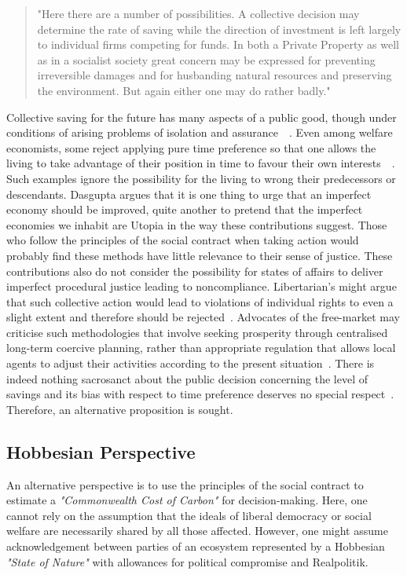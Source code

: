 \documentclass[12pt, oneside]{article}   	%
\begin{document}
\begin{quote}
"Here there are a number of possibilities. A collective decision may determine the rate of saving while the direction of investment is left largely to individual firms competing for funds. In both a Private Property as well as in a socialist society great concern may be expressed for preventing irreversible damages and for husbanding natural resources and preserving the environment. But again either one may do rather badly."~\cite{jr1}
\end{quote}

Collective saving for the future has many aspects of a public good, though under conditions of arising problems of isolation and assurance~\cite{as1}~\cite{ms1}.
Even among welfare economists, some reject applying pure time preference so that one allows the living to take advantage of their position in time to favour their own interests~\cite{hs1}~\cite{fr1}.
Such examples ignore the possibility for the living to wrong their predecessors or descendants.
Dasgupta argues that it is one thing to urge that an imperfect economy should be improved, quite another to pretend that the imperfect economies we inhabit are Utopia in the way these contributions suggest.
Those who follow the principles of the social contract when taking action would probably find these methods have little relevance to their sense of justice.
These contributions also do not consider the possibility for states of affairs to deliver imperfect procedural justice leading to noncompliance.
Libertarian's might argue that such collective action would lead to violations of individual rights to even a slight extent and therefore should be rejected~\cite{rn1}.
Advocates of the free-market may criticise such methodologies that involve seeking prosperity through centralised long-term coercive planning, rather than appropriate regulation that allows local agents to adjust their activities according to the present situation~\cite{fh1}.
There is indeed nothing sacrosanct about the public decision concerning the level of savings and its bias with respect to time preference deserves no special respect~\cite{jr1}.
Therefore, an alternative proposition is sought.\\

\subsection{Hobbesian Perspective}

An alternative perspective is to use the principles of the social contract to estimate a \emph{"Commonwealth Cost of Carbon"} for decision-making.
Here, one cannot rely on the assumption that the ideals of liberal democracy or social welfare are necessarily shared by all those affected.
However, one might assume acknowledgement between parties of an ecosystem represented by a Hobbesian \emph{"State of Nature"} with allowances for political compromise and Realpolitik.\\
\end{document}
